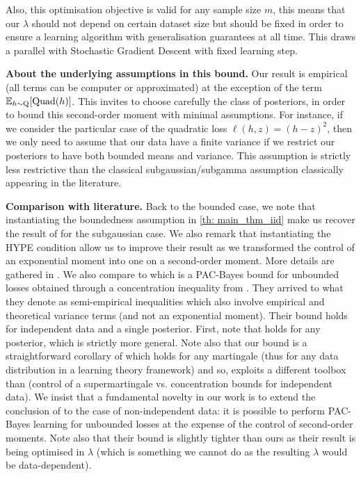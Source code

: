 Also, this optimisation objective is valid for any sample size $m$, this means that our $\lambda$ should not depend on certain dataset size but should be fixed in order to ensure a learning algorithm with generalisation guarantees at all time. This draws a parallel with Stochastic Gradient Descent with fixed learning step.


\textbf{About the underlying assumptions in this bound.} Our result  is empirical (all terms can be computer or approximated) at the exception of the term $\mathbb{E}_{h\sim \mathrm{Q}} [\mathrm{Quad}(h)]$. This invites to choose carefully the class of posteriors, in order to bound this second-order moment with minimal assumptions.
For instance, if we consider the particular case of the quadratic loss $\ell(h,z)= (h-z)^2$, then we only need to assume that our data have a finite variance if we restrict our posteriors to have both bounded means and variance. This assumption is strictly less restrictive than the classical subgaussian/subgamma assumption classically appearing in the literature.

\textbf{Comparison with literature.} Back to the bounded case, we note that instantiating the boundedness assumption in \cref{th: main_thm_iid} make us recover the result of \citet[][Theorem 4.1]{alquier2016properties} for the subgaussian case. We also remark that instantiating the HYPE condition \citet[][Theorem 3]{haddouche2021pac} allow us to improve their result as we transformed the control of an exponential moment into one on a second-order moment. More details are gathered in .
We also compare  to \citet[][Theorem 3]{kuzborskij2019efron} which is a PAC-Bayes bound for unbounded losses obtained through a concentration inequality from \citet{delapena2009self}. They arrived to what they denote as semi-empirical inequalities which also involve empirical and theoretical variance terms (and not an exponential moment). Their bound holds for independent data and a single posterior.
First, note that  holds for any posterior, which is strictly more general. Note also that our bound is a straightforward corollary of  which holds for any martingale (thus for any data distribution in a learning theory framework) and so, exploits a different toolbox than \citet{kuzborskij2019efron} (control of a supermartingale vs. concentration bounds for independent data). We insist that a fundamental novelty in our work is to extend the conclusion of \cite{kuzborskij2019efron} to the case of non-independent data: it is possible to perform PAC-Bayes learning for unbounded losses at the expense of the control of second-order moments.
Note also that their bound is slightly tighter than ours as their result is  being optimised in $\lambda$ (which is something we cannot do as the resulting $\lambda$ would be data-dependent).







